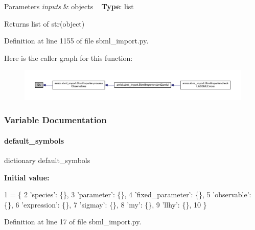 \begin{DoxyParams}{Parameters}
{\em inputs} & objects ~\newline
{\bfseries Type}\+: list\\
\hline
\end{DoxyParams}
\begin{DoxyReturn}{Returns}
list of str(object) 
\end{DoxyReturn}


Definition at line 1155 of file sbml\+\_\+import.\+py.

Here is the caller graph for this function\+:
\nopagebreak
\begin{figure}[H]
\begin{center}
\leavevmode
\includegraphics[width=350pt]{namespaceamici_1_1sbml__import_a6bff3fedaa877c35e5ea7bc112ec4adf_icgraph}
\end{center}
\end{figure}


\subsubsection{Variable Documentation}
\mbox{\label{namespaceamici_1_1sbml__import_abfb00dffe8d5c524c2916febc9b3810b}} 
\paragraph{\texorpdfstring{default\+\_\+symbols}{default\_symbols}}
{\footnotesize\ttfamily dictionary default\+\_\+symbols}

{\bfseries Initial value\+:}
\begin{DoxyCode}
1 =  \{
2     \textcolor{stringliteral}{'species'}: \{\},
3     \textcolor{stringliteral}{'parameter'}: \{\},
4     \textcolor{stringliteral}{'fixed\_parameter'}: \{\},
5     \textcolor{stringliteral}{'observable'}: \{\},
6     \textcolor{stringliteral}{'expression'}: \{\},
7     \textcolor{stringliteral}{'sigmay'}: \{\},
8     \textcolor{stringliteral}{'my'}: \{\},
9     \textcolor{stringliteral}{'llhy'}: \{\},
10 \}
\end{DoxyCode}


Definition at line 17 of file sbml\+\_\+import.\+py.

